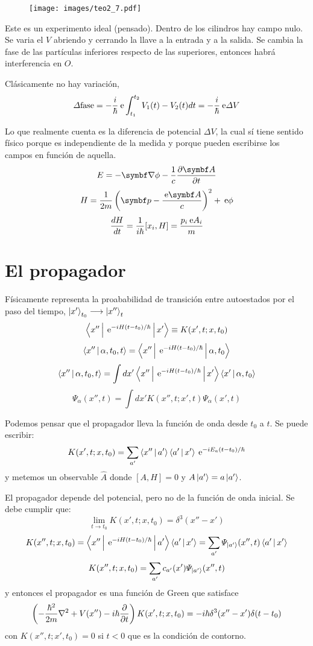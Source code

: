 \documentclass[10pt,oneside]{CBFT_book}
\begin{document}
\begin{figure}[htb]
	\begin{center}
	\texttt{[image: images/teo2\_7.pdf]}	 
	\end{center}
	\caption{}
\end{figure} 

Este es un experimento ideal (pensado). Dentro de los cilindros hay campo nulo. Se varia el $V$ abriendo y 
cerrando la 
llave a la entrada y a la salida.
Se cambia la fase de las partículas inferiores respecto de las superiores, entonces habrá interferencia en 
$O$.

Clásicamente no hay variación,
\[
	\Delta \text{fase} = -\frac{i}{\hbar}\:\mathrm{e} \int _{t_1}^{t_2} V_1(t) - V_2(t) dt = 
	-\frac{i}{\hbar}\:\mathrm{e} \Delta V
\]

Lo que realmente cuenta es la diferencia de potencial $\Delta V$, la cual sí tiene sentido físico porque es 
independiente de la medida y porque pueden escribirse los campos en función de aquella.
\[
	E = - \Nabla\phi - \frac{1}{c}\dpar{\vb{A}}{t}
\]
\[
	H = \frac{1}{2m} \left( \vb{p} - \frac{\euler\vb{A}}{c}\right)^2 + \euler\phi 
\]
\[
	\frac{d^{\hspace{-0.05em}} {H}}{d {t}^{\hspace{-0.05em}}} = \frac{1}{i\hbar}[x_i,H] = \frac{p_i  \:\mathrm{e} A_i}{m}
\]

\section{El propagador}

Físicamente representa la proababilidad de transición entre autoestados por el paso del tiempo,
$ \Ket{x'}_{t_0} \longrightarrow \Ket{x''}_t$
\[
	\Braket{x''|\:\mathrm{e}^{-iH(t-t_0)/\hbar}|x'} \equiv K(x',t; x, t_0)
\]
\[
	\Braket{x''| \alpha,t_0,t} = \Braket{x''|\:\mathrm{e}^{-iH(t-t_0)/\hbar}|\alpha,t_0} 
\]
\[
	\Braket{x''| \alpha,t_0,t} = \int dx' \Braket{x''|\:\mathrm{e}^{-iH(t-t_0)/\hbar}|x'}\Braket{x'|\alpha,t_0} 
\]
\[
	\Psi_{\alpha}(x'',t) = \int dx' K(x'',t; x',t) \Psi_{\alpha}(x',t)
\]

Podemos pensar que el propagador lleva la función de onda desde $t_0$ a $t$. Se puede escribir:
\[
	K(x',t; x, t_0) = \sum_{a'} \Braket{x''|a'} \Braket{a'|x'} \:\mathrm{e}^{-iE_a(t-t_0)/\hbar}
\]
y metemos un observable $\hat{A}$ donde $[A,H]=0$ y $A\Ket{a'}=a\Ket{a'}$.

El propagador depende del potencial, pero no de la función de onda inicial. Se debe cumplir que:
\[
	\lim_{t\to t_0} K(x',t; x, t_0) = \delta^3(x''-x')
\]
\[
	K(x'',t; x, t_0) = \Braket{x''|\:\mathrm{e}^{-iH(t-t_0)/\hbar}|a'} \Braket{a'|x'} =
		\sum_{a'} \Psi_{\Ket{a'}}(x'',t)\Braket{a'|x'}
\]
\[
	K(x'',t; x, t_0) = \sum_{a'} c_{a'}(x')\Psi_{\Ket{a'}}(x'',t)
\]
y entonces el propagador es una función de Green que satisface 
\[
	\left( -\frac{\hbar^2}{2m}\nabla^2 +V(x'') - i\hbar\frac{\partial^{\hspace{-0.05em}} {}}{\partial {t}^{\hspace{-0.05em}}} \right)K(x',t; x, t_0) =
		- i\hbar \delta^3(x''-x') \delta(t-t_0)
\]
con $K(x'',t;x',t_0)=0 $ si $t<0$ que es la condición de contorno.
\end{document}
